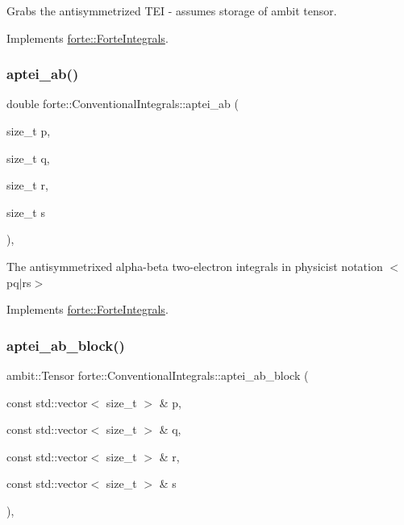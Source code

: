 Grabs the antisymmetrized T\+EI -\/ assumes storage of ambit tensor. 



Implements \mbox{\hyperlink{classforte_1_1_forte_integrals_ac20ae649b8cfe116f8583d676e43da27}{forte\+::\+Forte\+Integrals}}.

\mbox{\label{classforte_1_1_conventional_integrals_a7ebb8bcee10a6cbac613e7b626093731}} 
\subsubsection{\texorpdfstring{aptei\+\_\+ab()}{aptei\_ab()}}
{\footnotesize\ttfamily double forte\+::\+Conventional\+Integrals\+::aptei\+\_\+ab (\begin{DoxyParamCaption}\item[{size\+\_\+t}]{p,  }\item[{size\+\_\+t}]{q,  }\item[{size\+\_\+t}]{r,  }\item[{size\+\_\+t}]{s }\end{DoxyParamCaption})\hspace{0.3cm}{\ttfamily [override]}, {\ttfamily [virtual]}}



The antisymmetrixed alpha-\/beta two-\/electron integrals in physicist notation $<$pq$\vert$rs$>$ 



Implements \mbox{\hyperlink{classforte_1_1_forte_integrals_a45efc2329cdfc7e4690cbe85688b947e}{forte\+::\+Forte\+Integrals}}.

\mbox{\label{classforte_1_1_conventional_integrals_aeb46dfc0030e582c301b64a011e2af58}} 
\subsubsection{\texorpdfstring{aptei\+\_\+ab\+\_\+block()}{aptei\_ab\_block()}}
{\footnotesize\ttfamily ambit\+::\+Tensor forte\+::\+Conventional\+Integrals\+::aptei\+\_\+ab\+\_\+block (\begin{DoxyParamCaption}\item[{const std\+::vector$<$ size\+\_\+t $>$ \&}]{p,  }\item[{const std\+::vector$<$ size\+\_\+t $>$ \&}]{q,  }\item[{const std\+::vector$<$ size\+\_\+t $>$ \&}]{r,  }\item[{const std\+::vector$<$ size\+\_\+t $>$ \&}]{s }\end{DoxyParamCaption})\hspace{0.3cm}{\ttfamily [override]}, {\ttfamily [virtual]}}

